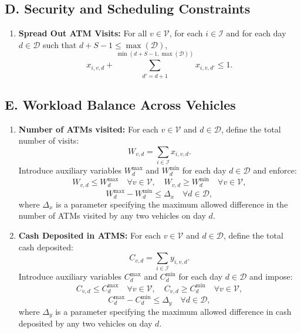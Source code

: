 \documentclass[11pt]{article}
\begin{document}
\subsection*{D. Security and Scheduling Constraints}
\begin{enumerate}[label=\textbf{(D\arabic*)}]
    \item \textbf{Spread Out ATM Visits:} For all \(v \in \mathcal{V}\), for each \(i \in \mathcal{I}\) and for each day \(d \in \mathcal{D}\) such that \(d+S-1 \le \max(\mathcal{D})\),
    \[
    x_{i,v,d} + \sum_{d' = d+1}^{\min(d+S-1,\max(\mathcal{D}))} x_{i,v,d'} \le 1.
    \]
\end{enumerate}

\subsection*{E. Workload Balance Across Vehicles}
\begin{enumerate}[label=\textbf{(E\arabic*)}]
    \item \textbf{Number of ATMs visited:} For each \(v \in \mathcal{V}\) and \(d \in \mathcal{D}\), define the total number of visits:
    \[
    W_{v,d} = \sum_{i \in \mathcal{I}} x_{i,v,d}.
    \]
    Introduce auxiliary variables \(W_d^{\max}\) and \(W_d^{\min}\) for each day \(d \in \mathcal{D}\) and enforce:
    \[
    W_{v,d} \le W_d^{\max} \quad \forall v \in \mathcal{V}, \quad 
    W_{v,d} \ge W_d^{\min} \quad \forall v \in \mathcal{V},
    \]
    \[
    W_d^{\max} - W_d^{\min} \le \Delta_x \quad \forall d \in \mathcal{D},
    \]
    where \(\Delta_x\) is a parameter specifying the maximum allowed difference in the number of ATMs visited by any two vehicles on day \(d\).
    
    \item \textbf{Cash Deposited in ATMS:} For each \(v \in \mathcal{V}\) and \(d \in \mathcal{D}\), define the total cash deposited:
    \[
    C_{v,d} = \sum_{i \in \mathcal{I}} y_{i,v,d}.
    \]
    Introduce auxiliary variables \(C_d^{\max}\) and \(C_d^{\min}\) for each day \(d \in \mathcal{D}\) and impose:
    \[
    C_{v,d} \le C_d^{\max} \quad \forall v \in \mathcal{V}, \quad 
    C_{v,d} \ge C_d^{\min} \quad \forall v \in \mathcal{V},
    \]
    \[
    C_d^{\max} - C_d^{\min} \le \Delta_y \quad \forall d \in \mathcal{D},
    \]
    where \(\Delta_y\) is a parameter specifying the maximum allowed difference in cash deposited by any two vehicles on day \(d\).

    
\end{enumerate}
\end{document}
